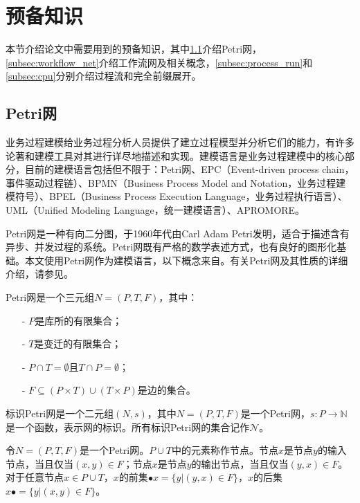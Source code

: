 \section{预备知识}\label{sec:preliminaries}
本节介绍论文中需要用到的预备知识，其中\ref{subsec:petrinet}介绍Petri网，\ref{subsec:workflow_net}介绍工作流网及相关概念，\ref{subsec:process_run}和\ref{subsec:cpu}分别介绍过程流和完全前缀展开。

\subsection{Petri网}\label{subsec:petrinet}
业务过程建模给业务过程分析人员提供了建立过程模型并分析它们的能力，有许多论著和建模工具对其进行详尽地描述和实现。建模语言是业务过程建模中的核心部分，目前的建模语言包括但不限于：Petri网、EPC（Event-driven process chain，事件驱动过程链）、BPMN（Business Process Model and Notation，业务过程建模符号）、BPEL（Business Process Execution Language，业务过程执行语言）、UML（Unified Modeling Language，统一建模语言）、APROMORE\cite{la2011apromore}。

Petri网是一种有向二分图，于1960年代由Carl Adam Petri发明\cite{petri1962kommunikation}，适合于描述含有异步、并发过程的系统。Petri网既有严格的数学表述方式，也有良好的图形化基础。本文使用Petri网作为建模语言，以下概念来自。有关Petri网及其性质的详细介绍，请参见。

\begin{definition}[Petri网]\label{def:petrinet}
Petri网是一个三元组$N=(P,T,F)$，其中：
  \begin{itemize}
  	\item[-] $P$是库所的有限集合；
  	\item[-] $T$是变迁的有限集合；
  	\item[-] $P\cap T=\emptyset$且$T\cap P=\emptyset$；
  	\item[-] $F\subseteq(P\times T)\cup(T\times P)$是边的集合。
  \end{itemize}
\end{definition}

\begin{definition}[标识Petri网]\label{def:marked_petrinet}
标识Petri网是一个二元组$(N,s)$，其中$N=(P,T,F)$是一个Petri网，$s:P\rightarrow\mathbb{N}$是一个函数，表示网的标识。所有标识Petri网的集合记作$\mathcal{N}$。
\end{definition}

令$N=(P,T,F)$是一个Petri网。$P\cup T$中的元素称作节点。节点$x$是节点$y$的输入节点，当且仅当$(x,y)\in F$；节点$x$是节点$y$的输出节点，当且仅当$(y,x)\in F$。对于任意节点$x\in P\cup T$，$x$的前集$\bullet x=\{y|(y,x)\in F\}$，$x$的后集$x\bullet=\{y|(x,y)\in F\}$。

